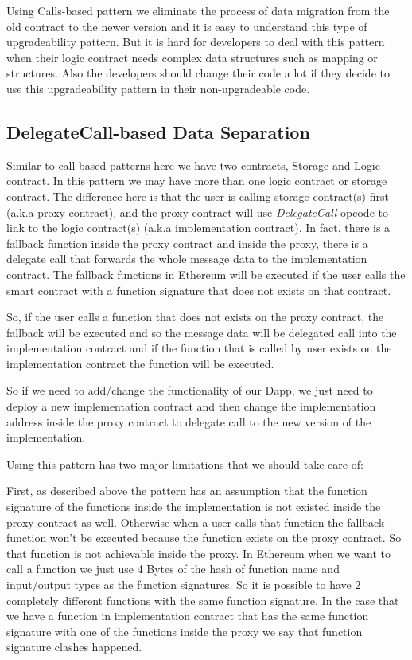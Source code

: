 Using Calls-based pattern we eliminate the process of data migration from the old contract to the newer version and it is easy to understand this type of upgradeability pattern. But it is hard for developers to deal with this pattern when their logic contract needs complex data structures such as mapping or structures. Also the developers should change their code a lot if they decide to use this upgradeability pattern in their non-upgradeable code. 


\subsection{DelegateCall-based Data Separation}

Similar to call based patterns here we have two contracts, Storage and Logic contract. In this pattern we may have more than one logic contract or storage contract. The difference here is that the user is calling storage contract(s) first (a.k.a proxy contract), and the proxy contract will use \textit{DelegateCall} opcode to link to the logic contract(s) (a.k.a implementation contract). In fact, there is a fallback function inside the proxy contract and inside the proxy, there is a delegate call that forwards the whole message data to the implementation contract.
The fallback functions in Ethereum will be executed if the user calls the smart contract with a function signature that does not exists on that contract.

So, if the user calls a function that does not exists on the proxy contract, the fallback will be executed and so the message data will be delegated call into the implementation contract and if the function that is called by user exists on the implementation contract the function will be executed.

So if we need to add/change the functionality of our Dapp, we just need to deploy a new implementation contract and then change the implementation address inside the proxy contract to delegate call to the new version of the implementation.

Using this pattern has two major limitations that we should take care of:

First, as described above the pattern has an assumption that the function signature of the functions inside the implementation is not existed inside the proxy contract as well. Otherwise when a user calls that function the fallback function won't be executed because the function exists on the proxy contract. So that function is not achievable inside the proxy. In Ethereum when we want to call a function we just use 4 Bytes of the hash of function name and input/output types as the function signatures. So it is possible to have 2 completely different functions with the same function signature. In the case that we have a function in implementation contract that has the same function signature with one of the functions inside the proxy we say that function signature clashes happened.

